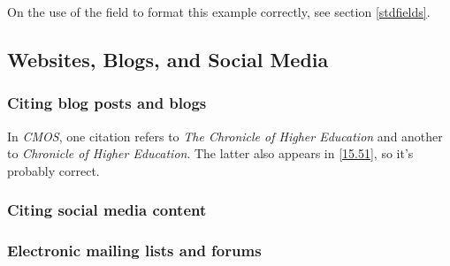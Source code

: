 \documentclass[11pt,letterpaper,oneside]{article}
\begin{document}
On the use of the  field to format this example
correctly, see section \ref{stdfields}.

\begin{citebib}
\item \cite{zeitung1828}
\end{citebib}

\setcounter{subsection}{6}
\subsection{Websites, Blogs, and Social Media}
\setcounter{subsection}{14}

\setcounter{subsubsection}{207}
\subsubsection{Citing blog posts and blogs}
\label{14.208}

In \textit{CMOS}, one citation refers to \textit{The Chronicle of
Higher Education} and another to \textit{Chronicle of Higher
Education}. The latter also appears in \ref{15.51}, so it's probably
correct.

\begin{citebib}
\item \cite{amlen2015}
\item \cite{germano2017}
\item \cite{amlen}
\item \cite{linguafranca}
\item \cite{jim2017}
\end{citebib}

\subsubsection{Citing social media content}

\begin{citebib}
\item \cite{diaz2016}
\item \cite{obrien2015}
\item \cite{chicago2015}
\item \cite{licis2016}
\end{citebib}

\subsubsection{Electronic mailing lists and forums}
\label{14.210}
\end{document}
